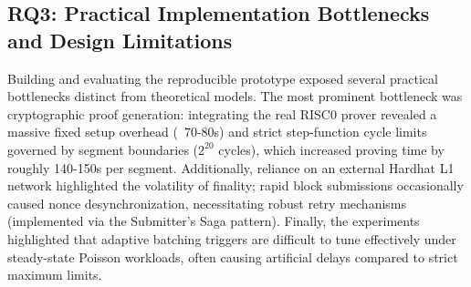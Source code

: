 \subsection{RQ3: Practical Implementation Bottlenecks and Design Limitations}
Building and evaluating the reproducible prototype exposed several practical bottlenecks distinct from theoretical models. The most prominent bottleneck was cryptographic proof generation: integrating the real RISC0 prover revealed a massive fixed setup overhead (~70-80s) and strict step-function cycle limits governed by segment boundaries ($2^{20}$ cycles), which increased proving time by roughly 140-150s per segment. Additionally, reliance on an external Hardhat L1 network highlighted the volatility of finality; rapid block submissions occasionally caused nonce desynchronization, necessitating robust retry mechanisms (implemented via the Submitter's Saga pattern). Finally, the experiments highlighted that adaptive batching triggers are difficult to tune effectively under steady-state Poisson workloads, often causing artificial delays compared to strict maximum limits.
